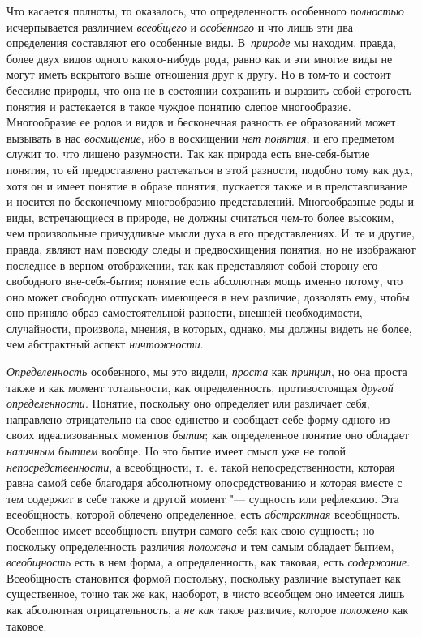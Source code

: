 Что касается полноты, то оказалось, что определенность
особенного {\em полностью}
исчерпывается различием
{\em всеобщего} и
{\em особенного} и что
лишь эти два определения составляют его особенные виды.
В~{\em природе} мы находим,
правда, более двух видов одного какого-нибудь рода, равно как и эти многие
виды не могут иметь вскрытого выше отношения друг к другу. Но в том-то и
состоит бессилие природы, что она не в состоянии сохранить и выразить собой
строгость понятия и растекается в такое чуждое понятию слепое многообразие.
Многообразие ее родов и видов и бесконечная разность ее образований может
вызывать в нас {\em восхищение},
ибо в восхищении {\em нет
понятия}, и его предметом служит то, что лишено разумности.
Так как природа есть вне-себя-бытие понятия, то ей предоставлено
растекаться в этой разности, подобно тому как дух, хотя он и имеет понятие
в образе понятия, пускается также и в представливание и носится по
бесконечному многообразию представлений. Многообразные роды и виды,
встречающиеся в природе, не должны считаться чем-то более высоким, чем
произвольные причудливые мысли духа в его представлениях. И~те и другие,
правда, являют нам повсюду следы и предвосхищения понятия, но не изображают
последнее в верном отображении, так как представляют собой сторону его
свободного вне-себя-бытия; понятие есть абсолютная мощь именно потому, что
оно может свободно отпускать имеющееся в нем различие, дозволять ему, чтобы
оно приняло образ самостоятельной разности, внешней необходимости,
случайности, произвола, мнения, в которых, однако, мы должны видеть не
более, чем абстрактный аспект
{\em ничтожности}.

{\em Определенность}
особенного, мы это видели,
{\em проста} как
{\em принцип}, но она
проста также и как момент тотальности, как определенность, противостоящая
{\em другой определенности}.
Понятие, поскольку оно определяет или различает себя,
направлено отрицательно на свое единство и сообщает себе форму одного из
своих идеализованных моментов
{\em бытия}; как
определенное понятие оно обладает
{\em наличным бытием}
вообще. Но это бытие имеет смысл уже не голой
{\em непосредственности},
а всеобщности, т.~е. такой непосредственности, которая равна
самой себе благодаря абсолютному опосредствованию и которая вместе с тем
содержит в себе также и другой момент "--- сущность или
рефлексию. Эта всеобщность, которой облечено определенное, есть
{\em абстрактная}
всеобщность. Особенное имеет всеобщность внутри самого себя
как свою сущность; но поскольку определенность различия
{\em положена} и тем
самым обладает бытием,
{\em всеобщность} есть в
нем форма, а определенность, как таковая, есть
{\em содержание}.
Всеобщность становится формой постольку, поскольку различие
выступает как существенное, точно так же как, наоборот, в чисто всеобщем
оно имеется лишь как абсолютная отрицательность, а
{\em не как} такое
различие, которое {\em положено}
как таковое.

